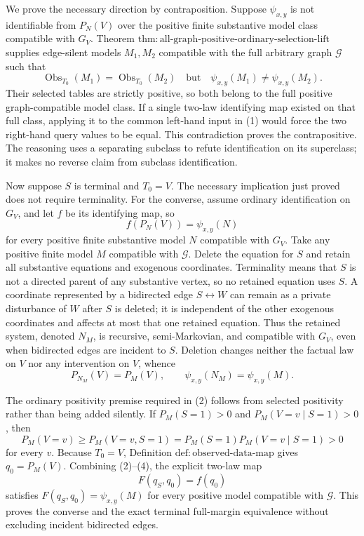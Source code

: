 We prove the necessary direction by contraposition. Suppose \(\psi_{x,y}\) is not identifiable from \(P_N(V)\) over the positive finite substantive model class compatible with \(G_V\). Theorem \(\mathrm{thm{:}all\text{-}graph\text{-}positive\text{-}ordinary\text{-}selection\text{-}lift}\) supplies edge-silent models \(M_1,M_2\) compatible with the full arbitrary graph \(\mathcal G\) such that
\[
 \operatorname{Obs}_{T_0}(M_1)=\operatorname{Obs}_{T_0}(M_2)
 \quad\text{but}\quad
 \psi_{x,y}(M_1)\ne\psi_{x,y}(M_2).
 \tag{1}
\]
Their selected tables are strictly positive, so both belong to the full positive graph-compatible model class. If a single two-law identifying map existed on that full class, applying it to the common left-hand input in (1) would force the two right-hand query values to be equal. This contradiction proves the contrapositive. The reasoning uses a separating subclass to refute identification on its superclass; it makes no reverse claim from subclass identification.

Now suppose \(S\) is terminal and \(T_0=V\). The necessary implication just proved does not require terminality. For the converse, assume ordinary identification on \(G_V\), and let \(f\) be its identifying map, so
\[
 f(P_N(V))=\psi_{x,y}(N)
 \tag{2}
\]
for every positive finite substantive model \(N\) compatible with \(G_V\). Take any positive finite model \(M\) compatible with \(\mathcal G\). Delete the equation for \(S\) and retain all substantive equations and exogenous coordinates. Terminality means that \(S\) is not a directed parent of any substantive vertex, so no retained equation uses \(S\). A coordinate represented by a bidirected edge \(S\leftrightarrow W\) can remain as a private disturbance of \(W\) after \(S\) is deleted; it is independent of the other exogenous coordinates and affects at most that one retained equation. Thus the retained system, denoted \(N_M\), is recursive, semi-Markovian, and compatible with \(G_V\), even when bidirected edges are incident to \(S\). Deletion changes neither the factual law on \(V\) nor any intervention on \(V\), whence
\[
 P_{N_M}(V)=P_M(V),
 \qquad
 \psi_{x,y}(N_M)=\psi_{x,y}(M).
 \tag{3}
\]

The ordinary positivity premise required in (2) follows from selected positivity rather than being added silently. If \(P_M(S=1)>0\) and \(P_M(V=v\mid S=1)>0\), then
\[
 P_M(V=v)
 \geq P_M(V=v,S=1)
 =P_M(S=1)P_M(V=v\mid S=1)>0
 \tag{4}
\]
for every \(v\). Because \(T_0=V\), Definition \(\mathrm{def{:}observed\text{-}data\text{-}map}\) gives \(q_0=P_M(V)\). Combining (2)--(4), the explicit two-law map
\[
 F(q_S,q_0)=f(q_0)
 \tag{5}
\]
satisfies \(F(q_S,q_0)=\psi_{x,y}(M)\) for every positive model compatible with \(\mathcal G\). This proves the converse and the exact terminal full-margin equivalence without excluding incident bidirected edges.

